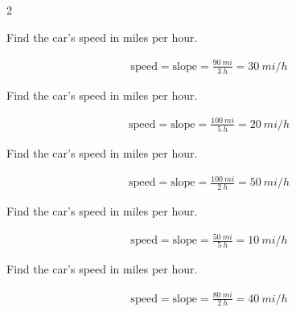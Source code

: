 \documentclass[]{exam}
\begin{document}
\begin{questions}
\begin{multicols}{2}

\question
Find the car's speed in miles per hour.


\begin{solution}

\begin{align*}
    \mathrm{speed} = \mathrm{slope} = \frac{\SI{90}{mi}}{\SI{3}{h}} = \boxed{\SI{30}{mi/h}}
\end{align*}
\end{solution}

\question
Find the car's speed in miles per hour.


\begin{solution}

\begin{align*}
    \mathrm{speed} = \mathrm{slope} = \frac{\SI{100}{mi}}{\SI{5}{h}} = \boxed{\SI{20}{mi/h}}
\end{align*}
\end{solution}

\question
Find the car's speed in miles per hour.


\begin{solution}

\begin{align*}
    \mathrm{speed} = \mathrm{slope} = \frac{\SI{100}{mi}}{\SI{2}{h}} = \boxed{\SI{50}{mi/h}}
\end{align*}
\end{solution}

\question
Find the car's speed in miles per hour.


\begin{solution}

\begin{align*}
    \mathrm{speed} = \mathrm{slope} = \frac{\SI{50}{mi}}{\SI{5}{h}} = \boxed{\SI{10}{mi/h}}
\end{align*}
\end{solution}

\question
Find the car's speed in miles per hour.


\begin{solution}

\begin{align*}
    \mathrm{speed} = \mathrm{slope} = \frac{\SI{80}{mi}}{\SI{2}{h}} = \boxed{\SI{40}{mi/h}}
\end{align*}
\end{solution}


\end{multicols}
\end{questions}
\end{document}
